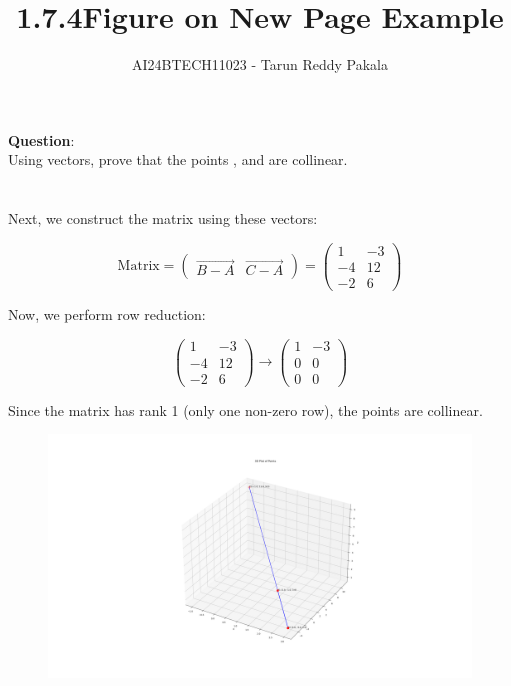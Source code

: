 \documentclass[journal,12pt,onecolumn]{IEEEtran}
\title{1.7.4}
\author{AI24BTECH11023 - Tarun Reddy Pakala}
\theoremstyle{remark}
\begin{document}


\maketitle
\bigskip

\renewcommand{\thefigure}{\theenumi}
\renewcommand{\thetable}{\theenumi}


\textbf{Question}:\\
Using vectors, prove that the points , and  are collinear.\\
\solution\\
\\

Next, we construct the matrix using these vectors:

\[
\text{Matrix} = 
\begin{pmatrix}
\overrightarrow{B-A} & \overrightarrow{C-A}
\end{pmatrix}
= 
\begin{pmatrix}
1 & -3 \\
-4 & 12 \\
-2 & 6
\end{pmatrix}
\]

Now, we perform row reduction:

\[
\begin{pmatrix}
1 & -3 \\
-4 & 12 \\
-2 & 6
\end{pmatrix}
\rightarrow
\begin{pmatrix}
1 & -3 \\
0 & 0 \\
0 & 0
\end{pmatrix}
\]

Since the matrix has rank 1 (only one non-zero row), the points are collinear.


\title{Figure on New Page Example}
\author{}
\date{}
\maketitle



\newpage %

\begin{figure}[h]
    \centering
    \includegraphics[width=\textwidth]{figure.png} 
    \label{fig:example_image}
\end{figure}
\end{document}
